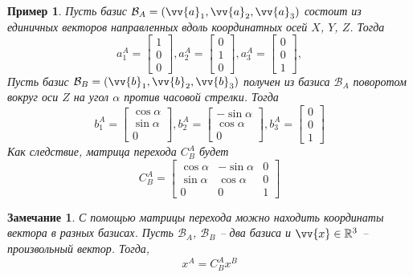 \documentclass[12pt]{article}
\newtheorem{remark}[theorem]{Замечание}
\newtheorem{example}[theorem]{Пример}
\begin{document}
\begin{example}
    Пусть базис $\mathcal{B}_A=(\vv{a}_1,\vv{a}_2,\vv{a}_3)$ состоит из
    единичных векторов направленных вдоль координатных осей $X$, $Y$, $Z$. Тогда
    $$
        a_1^A=\begin{bmatrix}1 \\ 0 \\ 0\end{bmatrix},
        a_2^A=\begin{bmatrix}0 \\ 1 \\ 0\end{bmatrix},
        a_3^A=\begin{bmatrix}0 \\ 0 \\ 1\end{bmatrix},
    $$
    Пусть базис $\mathcal{B}_B=(\vv{b}_1,\vv{b}_2,\vv{b}_3)$ получен из базиса $\mathcal{B}_A$
    поворотом вокруг оси $Z$ на угол
    $\alpha$ против часовой стрелки. Тогда
    $$
        b_1^A=\begin{bmatrix}\cos\alpha \\ \sin\alpha \\ 0\end{bmatrix},
        b_2^A=\begin{bmatrix}-\sin\alpha \\ \cos\alpha \\ 0\end{bmatrix},
        b_3^A=\begin{bmatrix}0 \\ 0 \\ 1\end{bmatrix}
    $$
    Как следствие, матрица перехода $C_B^A$ будет
    $$
        C_B^A=\begin{bmatrix}
            \cos\alpha & -\sin\alpha & 0 \\
            \sin\alpha & \cos\alpha  & 0 \\
            0          & 0           & 1
        \end{bmatrix}
    $$
\end{example}

\begin{remark}
    С помощью матрицы перехода можно находить координаты вектора в разных базисах. Пусть
    $\mathcal{B}_A$, $\mathcal{B}_B$ -- два базиса и $\vv{x}\in\mathbb{R}^3$ -- произвольный
    вектор. Тогда,
    $$
        x^A=C_B^A x^B
    $$
\end{remark}
\end{document}
